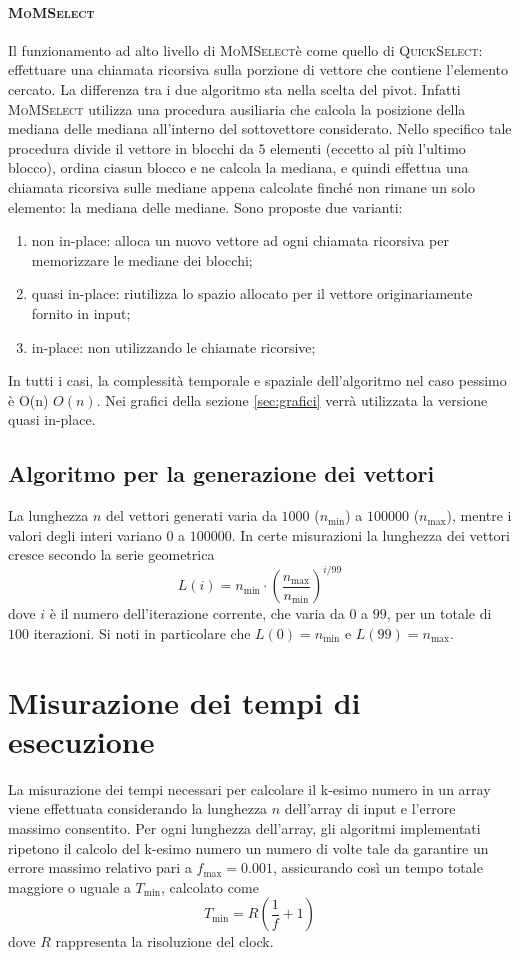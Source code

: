 \documentclass[a4paper]{article}
\newcommand{\QuickSelect}{\textsc{QuickSelect}}
\newcommand{\MoMSelect}{\textsc{MoMSelect}}
\newcommand{\Olin}{\ifmmode O(n) \else $O(n)$\fi} %
\begin{document}
\paragraph{\MoMSelect}
Il funzionamento ad alto livello di \MoMSelect è come quello di \QuickSelect: effettuare una chiamata ricorsiva sulla porzione di vettore che contiene l'elemento cercato.
La differenza tra i due algoritmo sta nella scelta del pivot.
Infatti \MoMSelect{} utilizza una procedura ausiliaria che calcola la posizione della mediana delle mediana all'interno del sottovettore considerato.
Nello specifico tale procedura divide il vettore in blocchi da $5$ elementi (eccetto al più l'ultimo blocco), ordina ciasun blocco e ne calcola la mediana, e quindi effettua una chiamata ricorsiva sulle mediane appena calcolate finché non rimane un solo elemento: la mediana delle mediane.
Sono proposte due varianti:
\begin{enumerate}
    \item non in-place: alloca un nuovo vettore ad ogni chiamata ricorsiva per memorizzare le mediane dei blocchi;
    \item quasi in-place: riutilizza lo spazio allocato per il vettore originariamente fornito in input;
    \item in-place: non utilizzando le chiamate ricorsive;
\end{enumerate}

In tutti i casi, la complessità temporale e spaziale dell'algoritmo nel caso pessimo è \Olin.
Nei grafici della sezione \ref{sec:grafici} verrà utilizzata la versione quasi in-place.

\subsection{Algoritmo per la generazione dei vettori}
La lunghezza $n$ del vettori generati varia da $1000$ ($n_{\min}$) a $100000$ ($n_{\max}$), mentre i valori degli interi variano $0$ a $100000$.
In certe misurazioni la lunghezza dei vettori cresce secondo la serie geometrica
\[
    L(i) = n_{\min} \cdot \left(\frac{n_{\max}}{n_{\min}}\right)^{i/99}
\]
dove $i$ è il numero dell'iterazione corrente, che varia da $0$ a $99$, per un totale di $100$ iterazioni.
Si noti in particolare che $L(0) = n_{\min}$ e $L(99) = n_{\max}$.


\section{Misurazione dei tempi di esecuzione}
\label{sec:misurazione}
La misurazione dei tempi necessari per calcolare il k-esimo numero in un array viene effettuata considerando la lunghezza \( n \) dell'array di input e l'errore massimo consentito. Per ogni lunghezza dell'array, gli algoritmi implementati ripetono il calcolo del k-esimo numero un numero di volte tale da garantire un errore massimo relativo pari a \( f_{\max} = 0.001 \), assicurando così un tempo totale maggiore o uguale a \( T_{\min} \), calcolato come \[ T_{\min} = R \left( \frac{1}{f} + 1 \right) \] dove \( R \) rappresenta la risoluzione del clock.
\end{document}
